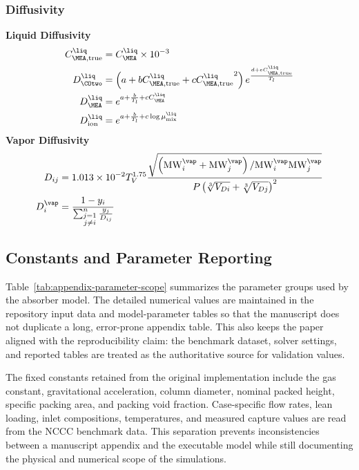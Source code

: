             \subsubsection{Diffusivity}
                \textbf{Liquid Diffusivity}
                \begin{align}
                    C^{\liq}_{\MEA,\text{true}} &= C^{\liq}_{\MEA} \times 10^{-3} \\
                    D^{\liq}_{ \COtwo} &= \left(a + b C^{\liq}_{\MEA,\text{true}} + c {C^{\liq}_{\MEA,\text{true}}}^2\right) e^{\frac{d + e C^{\liq}_{\MEA,\text{true}}}{T_l}} \\
                    D^{\liq}_{ \MEA} &= e^{a + \frac{b}{T_l} + c C^{\liq}_{\MEA}} \\
                    D^{\liq}_{ \text{ion}} &= e^{a + \frac{b}{T_l} + c \log{\mu ^{\liq}_{ \text{mix}}}}
                \end{align}
                \vspace{.5cm}
                \textbf{Vapor Diffusivity}
                \begin{align}
                    D_{i j} &= 1.013 \times 10^{-2} T_V^{1.75} \frac{\sqrt{\left(\text{MW}^{\vap}_{i}+\text{MW}^{\vap}_{j}\right) / \text{MW}^{\vap}_{i} \text{MW}^{\vap}_{j}}}{P\left(\sqrt[3]{V_{D i}}+\sqrt[3]{V_{D j}}\right)^2} \\
                    D^{\vap}_{ i} &= \frac{1-y_i}{\sum_{\substack{j=1 \\ j \neq i}}^n \frac{y_j}{D_{i j}}}
                \end{align}

        \newpage
        \subsection{Constants and Parameter Reporting}
            Table~\ref{tab:appendix-parameter-scope} summarizes the parameter groups used by the absorber model. The detailed numerical values are maintained in the repository input data and model-parameter tables so that the manuscript does not duplicate a long, error-prone appendix table. This also keeps the paper aligned with the reproducibility claim: the benchmark dataset, solver settings, and reported tables are treated as the authoritative source for validation values.

            

            The fixed constants retained from the original implementation include the gas constant, gravitational acceleration, column diameter, nominal packed height, specific packing area, and packing void fraction. Case-specific flow rates, lean loading, inlet compositions, temperatures, and measured capture values are read from the NCCC benchmark data. This separation prevents inconsistencies between a manuscript appendix and the executable model while still documenting the physical and numerical scope of the simulations.
    \clearpage

